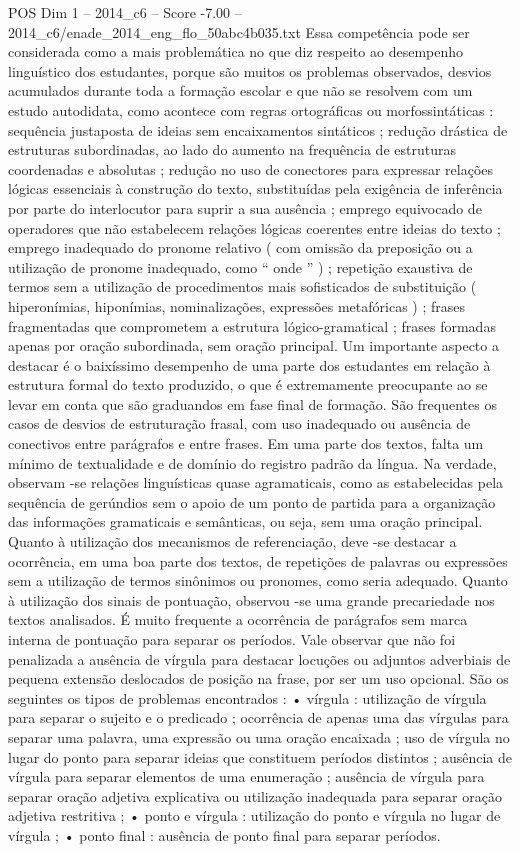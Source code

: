 \begin{textsample}{POS Dim 1 – 2014\_c6 – Score -7.00 – 2014\_c6/enade\_2014\_eng\_flo\_50abc4b035.txt}
Essa competência pode ser considerada como a mais problemática no que diz respeito ao desempenho linguístico dos estudantes, porque são muitos os problemas observados, desvios acumulados durante toda a formação escolar e que não se resolvem com um estudo autodidata, como acontece com regras ortográficas ou morfossintáticas : sequência justaposta de ideias sem encaixamentos sintáticos ; redução drástica de estruturas subordinadas, ao lado do aumento na frequência de estruturas coordenadas e absolutas ; redução no uso de conectores para expressar relações lógicas essenciais à construção do texto, substituídas pela exigência de inferência por parte do interlocutor para suprir a sua ausência ; emprego equivocado de operadores que não estabelecem relações lógicas coerentes entre ideias do texto ; emprego inadequado do pronome relativo ( com omissão da preposição ou a utilização de pronome inadequado, como “ onde ” ) ; repetição exaustiva de termos sem a utilização de procedimentos mais sofisticados de substituição ( hiperonímias, hiponímias, nominalizações, expressões metafóricas ) ; frases fragmentadas que comprometem a estrutura lógico-gramatical ; frases formadas apenas por oração subordinada, sem oração principal.
Um importante aspecto a destacar é o baixíssimo desempenho de uma parte dos estudantes em relação à estrutura formal do texto produzido, o que é extremamente preocupante ao se levar em conta que são graduandos em fase final de formação.
São frequentes os casos de desvios de estruturação frasal, com uso inadequado ou ausência de conectivos entre parágrafos e entre frases.
Em uma parte dos textos, falta um mínimo de textualidade e de domínio do registro padrão da língua.
Na verdade, observam -se relações linguísticas quase agramaticais, como as estabelecidas pela sequência de gerúndios sem o apoio de um ponto de partida para a organização das informações gramaticais e semânticas, ou seja, sem uma oração principal.
Quanto à utilização dos mecanismos de referenciação, deve -se destacar a ocorrência, em uma boa parte dos textos, de repetições de palavras ou expressões sem a utilização de termos sinônimos ou pronomes, como seria adequado.
Quanto à utilização dos sinais de pontuação, observou -se uma grande precariedade nos textos analisados.
É muito frequente a ocorrência de parágrafos sem marca interna de pontuação para separar os períodos.
Vale observar que não foi penalizada a ausência de vírgula para destacar locuções ou adjuntos adverbiais de pequena extensão deslocados de posição na frase, por ser um uso opcional.
São os seguintes os tipos de problemas encontrados : • vírgula : utilização de vírgula para separar o sujeito e o predicado ; ocorrência de apenas uma das vírgulas para separar uma palavra, uma expressão ou uma oração encaixada ; uso de vírgula no lugar do ponto para separar ideias que constituem períodos distintos ; ausência de vírgula para separar elementos de uma enumeração ; ausência de vírgula para separar oração adjetiva explicativa ou utilização inadequada para separar oração adjetiva restritiva ; • ponto e vírgula : utilização do ponto e vírgula no lugar de vírgula ; • ponto final : ausência de ponto final para separar períodos.

\end{textsample}
